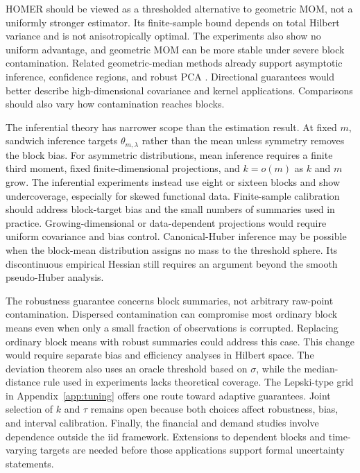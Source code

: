 \documentclass[twoside]{article}
\theoremstyle{definition}
\begin{document}
HOMER should be viewed as a thresholded alternative to geometric MOM, not a uniformly stronger estimator. Its finite-sample bound depends on total Hilbert variance and is not anisotropically optimal. The experiments also show no uniform advantage, and geometric MOM can be more stable under severe block contamination. Related geometric-median methods already support asymptotic inference, confidence regions, and robust PCA \citep{cardot_2013_EfficientFastEstimation,cardot_2017_OnlineEstimationGeometric,cardot_2017_FastEstimationMedian}. Directional guarantees would better describe high-dimensional covariance and kernel applications. Comparisons should also vary how contamination reaches blocks.

The inferential theory has narrower scope than the estimation result. At fixed $m$, sandwich inference targets $\theta_{m,\lambda}$ rather than the mean unless symmetry removes the block bias. For asymmetric distributions, mean inference requires a finite third moment, fixed finite-dimensional projections, and $k=o(m)$ as $k$ and $m$ grow. The inferential experiments instead use eight or sixteen blocks and show undercoverage, especially for skewed functional data. Finite-sample calibration should address block-target bias and the small numbers of summaries used in practice. Growing-dimensional or data-dependent projections would require uniform covariance and bias control. Canonical-Huber inference may be possible when the block-mean distribution assigns no mass to the threshold sphere. Its discontinuous empirical Hessian still requires an argument beyond the smooth pseudo-Huber analysis.

The robustness guarantee concerns block summaries, not arbitrary raw-point contamination. Dispersed contamination can compromise most ordinary block means even when only a small fraction of observations is corrupted. Replacing ordinary block means with robust summaries could address this case. This change would require separate bias and efficiency analyses in Hilbert space. The deviation theorem also uses an oracle threshold based on $\sigma$, while the median-distance rule used in experiments lacks theoretical coverage. The Lepski-type grid in Appendix~\ref{app:tuning} offers one route toward adaptive guarantees. Joint selection of $k$ and $\tau$ remains open because both choices affect robustness, bias, and interval calibration. Finally, the financial and demand studies involve dependence outside the iid framework. Extensions to dependent blocks and time-varying targets are needed before those applications support formal uncertainty statements.
\end{document}
